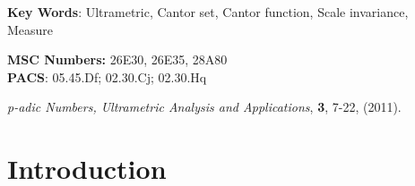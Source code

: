 \documentclass[12pt]{article}
\begin{document}
\begin{center} 
{\bf Key Words}: Ultrametric, Cantor set, Cantor function, Scale invariance, \\
Measure
\end{center}

\begin{center} 
{\bf MSC Numbers:} 26E30, 26E35, 28A80 \\
{\bf PACS}: 05.45.Df; 02.30.Cj; 02.30.Hq 
\end{center}

\begin{center}
 {\em p-adic Numbers, Ultrametric Analysis and Applications}, {\bf 3}, 7-22, (2011).
\end{center}
\newpage 

\section{Introduction}
\end{document}
